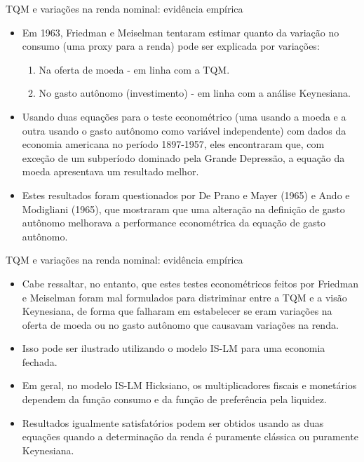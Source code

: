 \documentclass[10pt]{beamer}
\begin{document}
\begin{frame}{TQM e variações na renda nominal: evidência empírica}
    \begin{itemize}
        \item Em 1963, Friedman e Meiselman tentaram estimar quanto da variação no consumo (uma proxy para a renda) pode ser explicada por variações:
        \bigskip
        \begin{enumerate}
            \item Na oferta de moeda - em linha com a TQM.
            \bigskip
            \item No gasto autônomo (investimento) - em linha com a análise Keynesiana.
        \end{enumerate}
        \bigskip
        \item Usando duas equações para o teste econométrico (uma usando a moeda e a outra usando o gasto autônomo como variável independente) com dados da economia americana no período 1897-1957, eles encontraram que, com exceção de um subperíodo dominado pela Grande Depressão, a equação da moeda apresentava um resultado melhor.
        \bigskip
        \item Estes resultados foram questionados por De Prano e Mayer (1965) e Ando e Modigliani (1965), que mostraram que uma alteração na definição de gasto autônomo melhorava a performance econométrica da equação de gasto autônomo.
    \end{itemize}
\end{frame}

\begin{frame}{TQM e variações na renda nominal: evidência empírica}
    \begin{itemize}
        \item Cabe ressaltar, no entanto, que estes testes econométricos feitos por Friedman e Meiselman foram mal formulados para distriminar entre a TQM e a visão Keynesiana, de forma que falharam em estabelecer se eram variações na oferta de moeda ou no gasto autônomo que causavam variações na renda.
        \bigskip
        \item Isso pode ser ilustrado utilizando o modelo IS-LM para uma economia fechada.
        \bigskip
        \item Em geral, no modelo IS-LM Hicksiano, os multiplicadores fiscais e monetários dependem da função consumo e da função de preferência pela liquidez.
        \bigskip
        \item Resultados igualmente satisfatórios podem ser obtidos usando as duas equações quando a determinação da renda é puramente clássica ou puramente Keynesiana.
    \end{itemize}
\end{frame}
\end{document}
